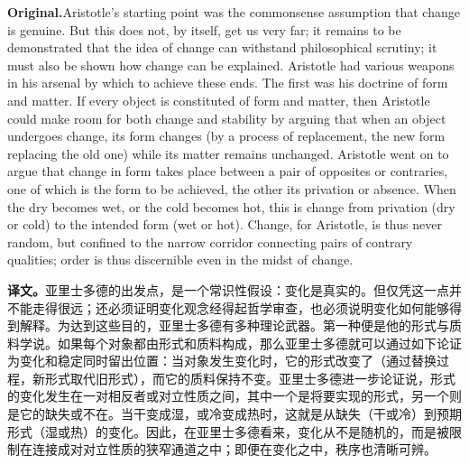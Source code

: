 \documentclass[UTF8]{ctexart}
\newcommand{\orig}{\par\noindent\textbf{Original.}\quad}
\newcommand{\zh}{\par\noindent\textbf{译文。}\quad}
\begin{document}
\orig Aristotle's starting point was the commonsense assumption that change is genuine. But this does not, by itself, get us very far; it remains to be demonstrated that the idea of change can withstand philosophical scrutiny; it must also be shown how change can be explained. Aristotle had various weapons in his arsenal by which to achieve these ends. The first was his doctrine of form and matter. If every object is constituted of form and matter, then Aristotle could make room for both change and stability by arguing that when an object undergoes change, its form changes (by a process of replacement, the new form replacing the old one) while its matter remains unchanged. Aristotle went on to argue that change in form takes place between a pair of opposites or contraries, one of which is the form to be achieved, the other its privation or absence. When the dry becomes wet, or the cold becomes hot, this is change from privation (dry or cold) to the intended form (wet or hot). Change, for Aristotle, is thus never random, but confined to the narrow corridor connecting pairs of contrary qualities; order is thus discernible even in the midst of change.

\zh 亚里士多德的出发点，是一个常识性假设：变化是真实的。但仅凭这一点并不能走得很远；还必须证明变化观念经得起哲学审查，也必须说明变化如何能够得到解释。为达到这些目的，亚里士多德有多种理论武器。第一种便是他的形式与质料学说。如果每个对象都由形式和质料构成，那么亚里士多德就可以通过如下论证为变化和稳定同时留出位置：当对象发生变化时，它的形式改变了（通过替换过程，新形式取代旧形式），而它的质料保持不变。亚里士多德进一步论证说，形式的变化发生在一对相反者或对立性质之间，其中一个是将要实现的形式，另一个则是它的缺失或不在。当干变成湿，或冷变成热时，这就是从缺失（干或冷）到预期形式（湿或热）的变化。因此，在亚里士多德看来，变化从不是随机的，而是被限制在连接成对对立性质的狭窄通道之中；即便在变化之中，秩序也清晰可辨。
\end{document}
